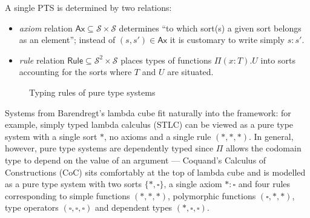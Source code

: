 \documentclass{article}
\theoremstyle{definition}
\theoremstyle{remark}
\begin{document}
A single PTS is determined by two relations:
\begin{itemize}
\item \textit{axiom} relation $\mathsf{Ax}\subseteq
    \mathcal{S}\times\mathcal{S}$ determines ``to which
    sort(s) a given sort belongs as an element'';
    instead of $(s,s')\in\mathsf{Ax}$ it is customary
    to write simply $s:s'$.
\item \textit{rule} relation $\mathsf{Rule}\subseteq
    \mathcal{S}^2\times\mathcal{S}$ places types of
    functions $\Pi(x:T).U$ into sorts accounting for
    the sorts where $T$ and $U$ are situated.
\end{itemize}

\begin{figure}[h]
\caption{Typing rules of pure type systems}
\label{typing}
\end{figure}

Systems from Barendregt's lambda cube
\cite{barendregt1991introduction,barendregt1992lambda} 
fit naturally into the framework: for example, simply
typed lambda calculus (STLC)
\cite{church1940formulation} can be viewed as a pure
type system with a single sort $*$, no axioms and a
single rule $(*,*,*)$. In general, however, pure type
systems are dependently typed since $\Pi$ allows the
codomain type to depend on the value of an argument ---
Coquand's Calculus of Constructions (CoC)
\cite{coquand1988calculus} sits comfortably at the top
of lambda cube and is modelled as a pure type system
with two sorts $\{*,\square\}$, a single axiom
$*:\square$ and four rules corresponding to simple
functions $(*,*,*)$, polymorphic functions
$(\square,*,*)$, type operators
$(\square,\square,\square)$ and dependent types
$(*,\square,\square)$.
\end{document}
